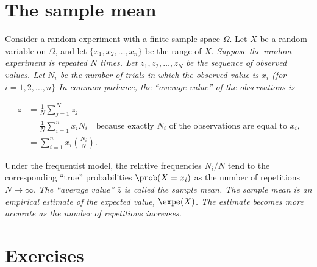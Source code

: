 \section{The sample mean}
Consider a random experiment with a finite sample space $\Omega$. Let $X$ be a random variable on $\Omega$, and let $\{x_1,x_2,\ldots,x_n\}$ be the range of $X$.
\bit 
\it Suppose the random experiment is repeated $N$ times.
\it Let $z_1,z_2,\ldots,z_N$ be the sequence of observed values.
\it Let $N_i$ be the number of trials in which the observed value is $x_i$ (for $i=1,2,\ldots,n\}$
\eit
In common parlance, the ``average value'' of the observations is
\begin{hidebox}
\begin{align*}
\bar{z} 
	& = \frac{1}{N}\sum_{j=1}^N z_j \\
	& = \frac{1}{N}\sum_{i=1}^n x_i N_i \quad\text{because exactly $N_i$ of the observations are equal to $x_i$,} \\
	& = \sum_{i=1}^n x_i\left(\frac{N_i}{N}\right).
\end{align*}
\end{hidebox}
Under the frequentist model, the relative frequencies $N_i/N$ tend to the corresponding ``true'' probabilities $\prob(X=x_i)$ as the number of repetitions $N\to\infty$.
\bit
\it The ``average value'' $\bar{z}$ is called the \emph{sample mean}.
\it The sample mean is an empirical estimate of the expected value, $\expe(X)$.
\it The estimate becomes more accurate as the number of repetitions increases.
\eit

\section{Exercises}


\endinput
